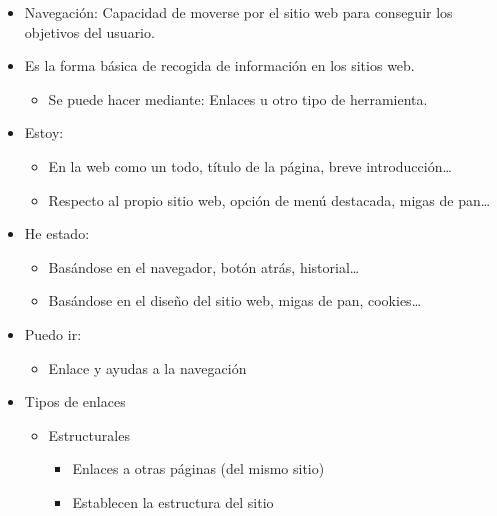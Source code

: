 \documentclass[12pt, twoside, openright]{report} %
\begin{document}
\begin{itemize}
	\item Navegación: Capacidad de moverse por el sitio web para conseguir
	      los objetivos del usuario.
	\item Es la forma básica de recogida de información en los sitios web.
	      \begin{itemize}
		      \item Se puede hacer mediante: Enlaces u otro tipo de herramienta.
	      \end{itemize}

	\item Estoy:

	      \begin{itemize}
		      \item En la web como un todo, título de la página, breve
		            introducción\ldots{}

		      \item Respecto al propio sitio web, opción de menú destacada, migas
		            de pan\ldots{}
	      \end{itemize}
	      \pagebreak

	\item He estado:

	      \begin{itemize}
		      \item Basándose en el navegador, botón atrás, historial\ldots{}

		      \item Basándose en el diseño del sitio web, migas de pan,
		            cookies\ldots{}
	      \end{itemize}

	\item Puedo ir:

	      \begin{itemize}
		      \item Enlace y ayudas a la navegación
	      \end{itemize}
	\item Tipos de enlaces

	      \begin{itemize}
		      \item Estructurales

		            \begin{itemize}
			            \item Enlaces a otras páginas (del mismo sitio)

			            \item Establecen la estructura del sitio
		            \end{itemize}


\end{itemize}
\end{itemize}
\end{document}
